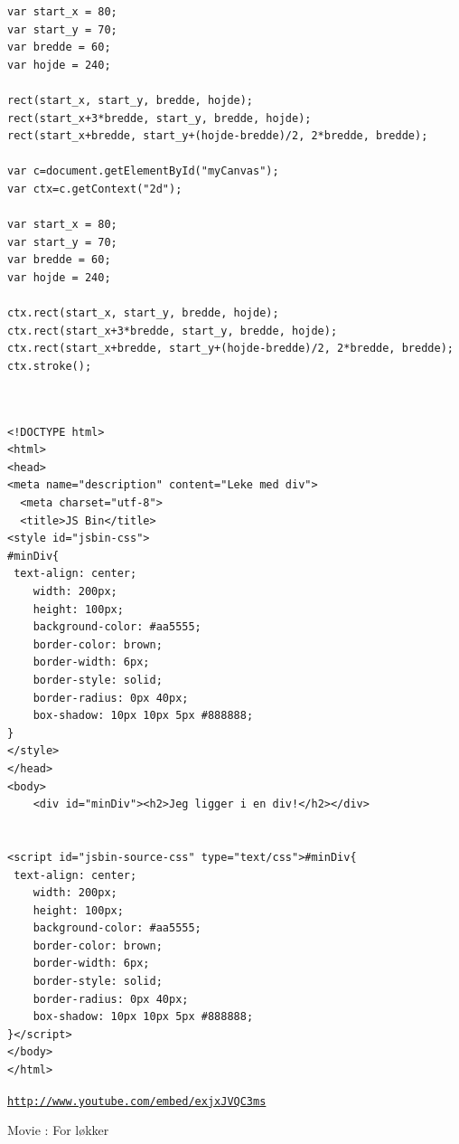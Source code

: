 \documentclass[%
oneside,                 %
final,                   %
12pt]{article}
\newenvironment{doconce:movie}{}{}
\newcounter{doconce:movie:counter}
\newenvironment{notice_mdfboxadmon}[1][]{
\begin{notice_mdfboxmdframed}[frametitle=#1]
}
{
\end{notice_mdfboxmdframed}
}
\begin{document}
 



\begin{verbatim}
var start_x = 80;
var start_y = 70;
var bredde = 60;
var hojde = 240;

rect(start_x, start_y, bredde, hojde);
rect(start_x+3*bredde, start_y, bredde, hojde);
rect(start_x+bredde, start_y+(hojde-bredde)/2, 2*bredde, bredde);

var c=document.getElementById("myCanvas");
var ctx=c.getContext("2d");

var start_x = 80;
var start_y = 70;
var bredde = 60;
var hojde = 240;

ctx.rect(start_x, start_y, bredde, hojde);
ctx.rect(start_x+3*bredde, start_y, bredde, hojde);
ctx.rect(start_x+bredde, start_y+(hojde-bredde)/2, 2*bredde, bredde);
ctx.stroke();



\end{verbatim}


\begin{notice_mdfboxadmon}
\begin{verbatim}
<!DOCTYPE html>
<html>
<head>
<meta name="description" content="Leke med div">
  <meta charset="utf-8">
  <title>JS Bin</title>
<style id="jsbin-css">
#minDiv{
 text-align: center;
	width: 200px;
	height: 100px;
	background-color: #aa5555;
	border-color: brown;
	border-width: 6px;
	border-style: solid;
	border-radius: 0px 40px;
	box-shadow: 10px 10px 5px #888888;
}
</style>
</head>
<body>
	<div id="minDiv"><h2>Jeg ligger i en div!</h2></div>


<script id="jsbin-source-css" type="text/css">#minDiv{
 text-align: center;
	width: 200px;
	height: 100px;
	background-color: #aa5555;
	border-color: brown;
	border-width: 6px;
	border-style: solid;
	border-radius: 0px 40px;
	box-shadow: 10px 10px 5px #888888;
}</script>
</body>
</html>
\end{verbatim}
\end{notice_mdfboxadmon}

 



\begin{doconce:movie}
\begin{center}
\href{{http://www.youtube.com/embed/exjxJVQC3ms}}{\nolinkurl{http://www.youtube.com/embed/exjxJVQC3ms}}
\end{center}

\begin{center}  %
Movie : For løkker
\end{center}
\end{doconce:movie}





\printindex
\end{document}
